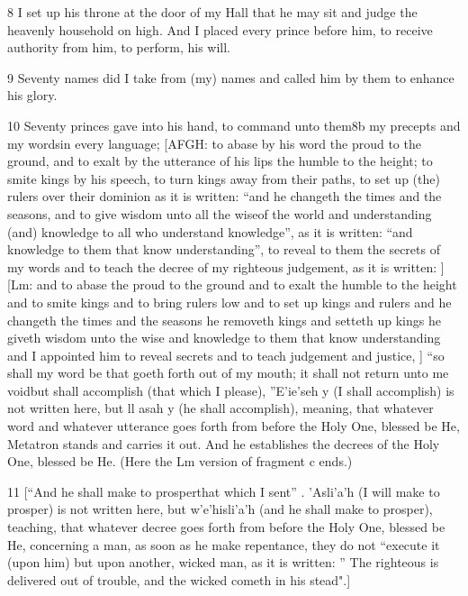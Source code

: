 \par 8 I set up his throne at the door of my Hall that he may sit and judge the heavenly household on high. And I placed every prince before him, to receive authority from him, to perform, his will. 

\par 9 Seventy names did I take from (my) names and called him by them to enhance his glory. 

\par 10 Seventy princes gave into his hand, to command unto them8b my precepts and my wordsin every language; [AFGH: to abase by his word the proud to the ground, and to exalt by the utterance of his lips the humble to the height; to smite kings by his speech, to turn kings away from their paths, to set up (the) rulers over their dominion as it is written: “and he changeth the times and the seasons, and to give wisdom unto all the wiseof the world and understanding (and) knowledge to all who understand knowledge”, as it is written: “and knowledge to them that know understanding”, to reveal to them the secrets of my words and to teach the decree of my righteous judgement, as it is written: ] [Lm: and to abase the proud to the ground and to exalt the humble to the height and to smite kings and to bring rulers low and to set up kings and rulers and he changeth the times and the seasons he removeth kings and setteth up kings he giveth wisdom unto the wise and knowledge to them that know understanding and I appointed him to reveal secrets and to teach judgement and justice, ] “so shall my word be that goeth forth out of my mouth; it shall not return unto me voidbut shall accomplish (that which I please), ”E'ie'seh y (I shall accomplish) is not written here, but ll asah y (he shall accomplish), meaning, that whatever word and whatever utterance goes forth from before the Holy One, blessed be He, Metatron stands and carries it out. And he establishes the decrees of the Holy One, blessed be He. (Here the Lm version of fragment c ends.) 

\par 11 [“And he shall make to prosperthat which I sent” . 'Asli'a'h (I will make to prosper) is not written here, but w'e'hisli'a'h (and he shall make to prosper), teaching, that whatever decree goes forth from before the Holy One, blessed be He, concerning a man, as soon as he make repentance, they do not “execute it (upon him) but upon another, wicked man, as it is written: ” The righteous is delivered out of trouble, and the wicked cometh in his stead".] 

